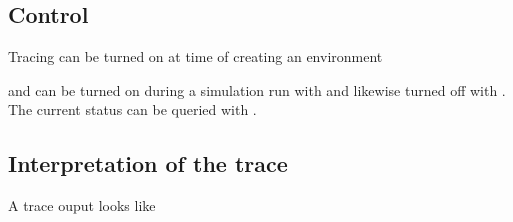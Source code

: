 \documentclass[letterpaper,10pt,english]{sphinxmanual}
\begin{document}
\subsection{Control}
\label{\detokenize{Miscellaneous:control}}
Tracing can be turned on at time of creating an environment

\begin{sphinxVerbatim}[commandchars=\\\{\}]
  
\end{sphinxVerbatim}

and can be turned on during a simulation run with  and likewise
turned off with . The current status can be queried with .


\subsection{Interpretation of the trace}
\label{\detokenize{Miscellaneous:interpretation-of-the-trace}}
A trace ouput looks like
\end{document}
